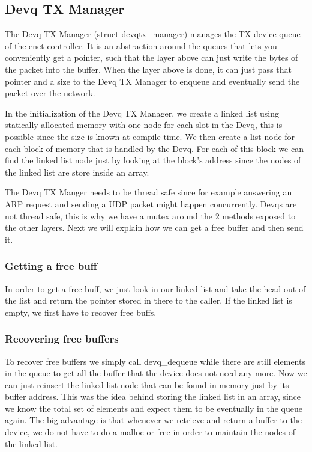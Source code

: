 \subsection{Devq TX Manager}

The Devq TX Manager (struct devqtx\_manager) manages the TX device queue of the enet controller. It is an abstraction around the queues that lets you conveniently get a pointer, such that the layer above can just write the bytes of the packet into the buffer. When the layer above is done, it can just pass that pointer and a size to the Devq TX Manager to enqueue and eventually send the packet over the network.

In the initialization of the Devq TX Manager, we create a linked list using statically allocated memory with one node for each slot in the Devq, this is possible since the size is known at compile time. We then create a list node for each block of memory that is handled by the Devq. For each of this block we can find the linked list node just by looking at the block's address since the nodes of the linked list are store inside an array. 

The Devq TX Manger needs to be thread safe since for example answering an ARP request and sending a UDP packet might happen concurrently. Devqs are not thread safe, this is why we have a mutex around the 2 methods exposed to the other layers.
Next we will explain how we can get a free buffer and then send it. 
\subsubsection{Getting a free buff} 

In order to get a free buff, we just look in our linked list and take the head out of the list and return the pointer stored in there to the caller. 
If the linked list is empty, we first have to recover free buffs. 

\subsubsection{Recovering free buffers}  

To recover free buffers we simply call devq\_dequeue while there are still elements in the queue to get all the buffer that the device does not need any more. 
Now we can just reinsert the linked list node that can be found in memory just by its buffer address. 
This was the idea behind storing the linked list in an array, since we know the total set of elements and expect them to be eventually in the queue again. 
The big advantage is that whenever we retrieve and return a buffer to the device, we do not have to do a malloc or free in order to maintain the nodes of the linked list.

